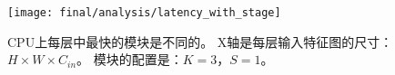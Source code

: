 \begin{figure}[htbp]
    \centering
    \texttt{[image: final/analysis/latency\_with\_stage]}
    \caption{
        CPU上每层中最快的模块是不同的。
        X轴是每层输入特征图的尺寸：$H \times W \times C_{in}$。
        模块的配置是：$K=3$，$S=1$。
    }
    \label{fig:block_latency_cpu}
\end{figure}